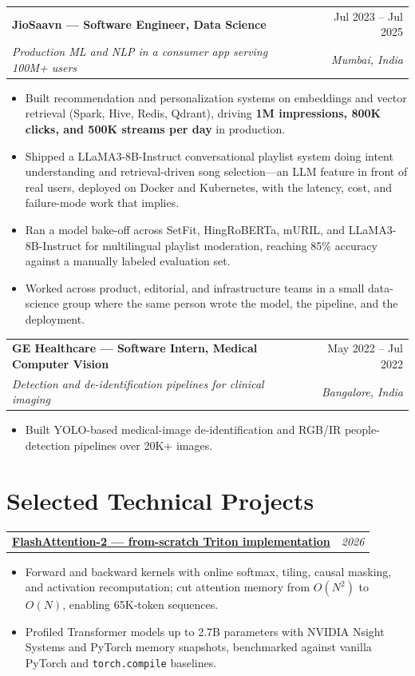 \documentclass[10pt,letterpaper]{article}
\makeatletter
\newcommand{\entry}[4]{%
  \begin{tabularx}{\textwidth}{@{}Xr@{}}
    \textbf{#1} & #2 \\
    \textit{#3} & \textit{#4}
  \end{tabularx}\vspace{-0.2em}
}
\newcommand{\project}[2]{%
  \begin{tabularx}{\textwidth}{@{}Xr@{}}
    \textbf{#1} & \textit{#2}
  \end{tabularx}\vspace{-0.25em}
}
\makeatother
\begin{document}
\vspace{0.65em}
\entry{JioSaavn --- Software Engineer, Data Science}{Jul 2023 -- Jul 2025}{Production ML and NLP in a consumer app serving 100M+ users}{Mumbai, India}
\begin{itemize}
  \item Built recommendation and personalization systems on embeddings and vector retrieval (Spark, Hive, Redis, Qdrant), driving \textbf{1M impressions, 800K clicks, and 500K streams per day} in production.
  \item Shipped a LLaMA3-8B-Instruct conversational playlist system doing intent understanding and retrieval-driven song selection---an LLM feature in front of real users, deployed on Docker and Kubernetes, with the latency, cost, and failure-mode work that implies.
  \item Ran a model bake-off across SetFit, HingRoBERTa, mURIL, and LLaMA3-8B-Instruct for multilingual playlist moderation, reaching 85\% accuracy against a manually labeled evaluation set.
  \item Worked across product, editorial, and infrastructure teams in a small data-science group where the same person wrote the model, the pipeline, and the deployment.
\end{itemize}

\vspace{0.65em}
\entry{GE Healthcare --- Software Intern, Medical Computer Vision}{May 2022 -- Jul 2022}{Detection and de-identification pipelines for clinical imaging}{Bangalore, India}
\begin{itemize}
  \item Built YOLO-based medical-image de-identification and RGB/IR people-detection pipelines over 20K+ images.
\end{itemize}

\section{Selected Technical Projects}

\project{\href{https://github.com/k-keshav-k/Flash-Attention}{FlashAttention-2 --- from-scratch Triton implementation}}{2026}
\begin{itemize}
  \item Forward and backward kernels with online softmax, tiling, causal masking, and activation recomputation; cut attention memory from $O(N^2)$ to $O(N)$, enabling 65K-token sequences.
  \item Profiled Transformer models up to 2.7B parameters with NVIDIA Nsight Systems and PyTorch memory snapshots, benchmarked against vanilla PyTorch and \texttt{torch.compile} baselines.
\end{itemize}
\end{document}

